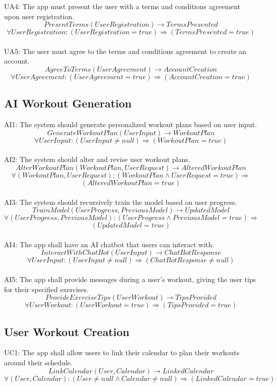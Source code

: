 \documentclass[12pt]{article}
\begin{document}
UA4: The app must present the user with a terms and conditions agreement upon user registration.
\[PresentTerms(UserRegistration) \rightarrow TermsPresented \]
\[ \forall UserRegistration: (UserRegistration = true) \Rightarrow (TermsPresented = true) \]\\

UA5: The user must agree to the terms and conditions agreement to create an account.
\[AgreeToTerms(UserAgreement) \rightarrow AccountCreation \]
\[ \forall UserAgreement: (UserAgreement = true) \Rightarrow (AccountCreation = true) \]

\subsection{AI Workout Generation}

\parindent AI1: The system should generate personalized workout plans based on user input.
\[GenerateWorkoutPlan(UserInput) \rightarrow WorkoutPlan \]
\[ \forall UserInput: (UserInput \neq null) \Rightarrow (WorkoutPlan = true) \]\\

AI2: The system should alter and revise user workout plans.
\[AlterWorkoutPlan(WorkoutPlan, UserRequest) \rightarrow AlteredWorkoutPlan \]
\[ \forall (WorkoutPlan, UserRequest): (WorkoutPlan \land UserRequest = true) \Rightarrow\] \[(AlteredWorkoutPlan = true) \]\\

AI3: The system should recursively train the model based on user progress.
\[TrainModel(UserProgress, PreviousModel) \rightarrow UpdatedModel \]
\[ \forall (UserProgress, PreviousModel): (UserProgress \land PreviousModel = true) \Rightarrow\] \[(UpdatedModel = true) \]\\

AI4: The app shall have an AI chatbot that users can interact with.
\[InteractWithChatBot(UserInput) \rightarrow ChatBotResponse \]
\[ \forall UserInput: (UserInput \neq null) \Rightarrow (ChatBotResponse \neq null) \]\\

AI5: The app shall provide messages during a user's workout, giving the user tips for their specified exercises.
\[ProvideExerciseTips(UserWorkout) \rightarrow TipsProvided \]
\[ \forall UserWorkout: (UserWorkout = true) \Rightarrow (TipsProvided = true) \]

\subsection{User Workout Creation}
UC1: The app shall allow users to link their calendar to plan their workouts around their schedule.
\[LinkCalendar(User, Calendar) \rightarrow LinkedCalendar \]
\[ \forall (User, Calendar): (User \neq null \land Calendar \neq null) \Rightarrow (LinkedCalendar = true) \]
\\
\end{document}
